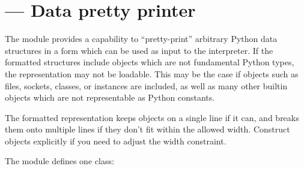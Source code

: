 \section{ ---
         Data pretty printer}



The  module provides a capability to ``pretty-print''
arbitrary Python data structures in a form which can be used as input
to the interpreter.  If the formatted structures include objects which
are not fundamental Python types, the representation may not be
loadable.  This may be the case if objects such as files, sockets,
classes, or instances are included, as well as many other builtin
objects which are not representable as Python constants.

The formatted representation keeps objects on a single line if it can,
and breaks them onto multiple lines if they don't fit within the
allowed width.  Construct  objects explicitly if
you need to adjust the width constraint.

The  module defines one class:



